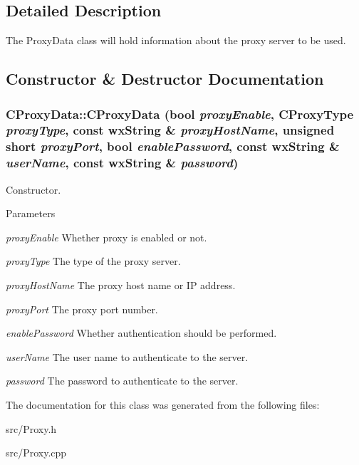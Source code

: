 \subsection{Detailed Description}
The ProxyData class will hold information about the proxy server to be used. 

\subsection{Constructor \& Destructor Documentation}
\subsubsection[{CProxyData}]{\setlength{\rightskip}{0pt plus 5cm}CProxyData::CProxyData (bool {\em proxyEnable}, \/  CProxyType {\em proxyType}, \/  const wxString \& {\em proxyHostName}, \/  unsigned short {\em proxyPort}, \/  bool {\em enablePassword}, \/  const wxString \& {\em userName}, \/  const wxString \& {\em password})}\label{classCProxyData_a02e928eb8014bdb284fa19df13ebc044}


Constructor. 
\begin{DoxyParams}{Parameters}
\item[{\em proxyEnable}]Whether proxy is enabled or not. \item[{\em proxyType}]The type of the proxy server. \item[{\em proxyHostName}]The proxy host name or IP address. \item[{\em proxyPort}]The proxy port number. \item[{\em enablePassword}]Whether authentication should be performed. \item[{\em userName}]The user name to authenticate to the server. \item[{\em password}]The password to authenticate to the server. \end{DoxyParams}


The documentation for this class was generated from the following files:\begin{DoxyCompactItemize}
\item 
src/Proxy.h\item 
src/Proxy.cpp\end{DoxyCompactItemize}
